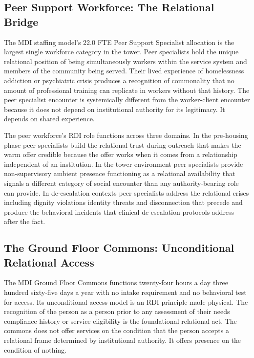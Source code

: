 \documentclass[12pt, letterpaper]{article}
\begin{document}
\subsection{Peer Support Workforce: The Relational Bridge}

The MDI staffing model's 22.0 FTE Peer Support Specialist allocation is the largest single workforce category in the tower. Peer specialists hold the unique relational position of being simultaneously workers within the service system and members of the community being served. Their lived experience of homelessness addiction or psychiatric crisis produces a recognition of commonality that no amount of professional training can replicate in workers without that history. The peer specialist encounter is systemically different from the worker-client encounter because it does not depend on institutional authority for its legitimacy. It depends on shared experience.

The peer workforce's RDI role functions across three domains. In the pre-housing phase peer specialists build the relational trust during outreach that makes the warm offer credible because the offer works when it comes from a relationship independent of an institution. In the tower environment peer specialists provide non-supervisory ambient presence functioning as a relational availability that signals a different category of social encounter than any authority-bearing role can provide. In de-escalation contexts peer specialists address the relational crises including dignity violations identity threats and disconnection that precede and produce the behavioral incidents that clinical de-escalation protocols address after the fact.

\subsection{The Ground Floor Commons: Unconditional Relational Access}

The MDI Ground Floor Commons functions twenty-four hours a day three hundred sixty-five days a year with no intake requirement and no behavioral test for access. Its unconditional access model is an RDI principle made physical. The recognition of the person as a person prior to any assessment of their needs compliance history or service eligibility is the foundational relational act. The commons does not offer services on the condition that the person accepts a relational frame determined by institutional authority. It offers presence on the condition of nothing.
\end{document}
